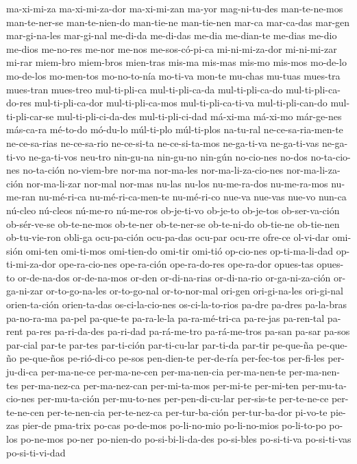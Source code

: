 {ma-xi-mi-za ma-xi-mi-za-dor ma-xi-mi-zan ma-yor mag-ni-tu-des man-te-ne-mos man-te-ner-se man-te-nien-do
man-tie-ne man-tie-nen mar-ca mar-ca-das mar-gen mar-gi-na-les mar-gi-nal me-di-da me-di-das me-dia
me-dian-te me-dias me-dio me-dios me-no-res me-nor me-nos me-sos-có-pi-ca mi-ni-mi-za-dor mi-ni-mi-zar
mi-rar miem-bro miem-bros mien-tras mis-ma mis-mas mis-mo mis-mos mo-de-lo mo-de-los mo-men-tos mo-no-to-nía
mo-ti-va mon-te mu-chas mu-tuas mues-tra mues-tran mues-treo mul-ti-pli-ca mul-ti-pli-ca-da mul-ti-pli-ca-do
mul-ti-pli-ca-do-res mul-ti-pli-ca-dor mul-ti-pli-ca-mos mul-ti-pli-ca-ti-va mul-ti-pli-can-do
mul-ti-pli-car-se mul-ti-pli-ci-da-des mul-ti-pli-ci-dad má-xi-ma má-xi-mo már-ge-nes más-ca-ra mé-to-do
mó-du-lo múl-ti-plo múl-ti-plos na-tu-ral ne-ce-sa-ria-men-te ne-ce-sa-rias ne-ce-sa-rio ne-ce-si-ta
ne-ce-si-ta-mos ne-ga-ti-va ne-ga-ti-vas ne-ga-ti-vo ne-ga-ti-vos neu-tro nin-gu-na nin-gu-no nin-gún
no-cio-nes no-dos no-ta-cio-nes no-ta-ción no-viem-bre nor-ma nor-ma-les nor-ma-li-za-cio-nes
nor-ma-li-za-ción nor-ma-li-zar nor-mal nor-mas nu-las nu-los nu-me-ra-dos nu-me-ra-mos nu-me-ran
nu-mé-ri-ca nu-mé-ri-ca-men-te nu-mé-ri-co nue-va nue-vas nue-vo nun-ca nú-cleo nú-cleos nú-me-ro nú-me-ros
ob-je-ti-vo ob-je-to ob-je-tos ob-ser-va-ción ob-sér-ve-se ob-te-ne-mos ob-te-ner ob-te-ner-se ob-te-ni-do
ob-tie-ne ob-tie-nen ob-tu-vie-ron obli-ga ocu-pa-ción ocu-pa-das ocu-par ocu-rre ofre-ce ol-vi-dar omi-sión
omi-ten omi-ti-mos omi-tien-do omi-tir omi-tió op-cio-nes op-ti-ma-li-dad op-ti-mi-za-dor ope-ra-cio-nes
ope-ra-ción ope-ra-do-res ope-ra-dor opues-tas opues-to or-de-na-dos or-de-na-mos or-den or-di-na-rias
or-di-na-rio or-ga-ni-za-ción or-ga-ni-zar or-to-go-na-les or-to-go-nal or-to-nor-mal ori-gen ori-gi-na-les
ori-gi-nal orien-ta-ción orien-ta-das os-ci-la-cio-nes os-ci-la-to-rios pa-dre pa-dres pa-la-bras
pa-no-ra-ma pa-pel pa-que-te pa-ra-le-la pa-ra-mé-tri-ca pa-re-jas pa-ren-tal pa-rent pa-res pa-ri-da-des
pa-ri-dad pa-rá-me-tro pa-rá-me-tros pa-san pa-sar pa-sos par-cial par-te par-tes par-ti-ción par-ti-cu-lar
par-ti-da par-tir pe-que-ña pe-que-ño pe-que-ños pe-rió-di-co pe-sos pen-dien-te per-de-ría per-fec-tos
per-fi-les per-ju-di-ca per-ma-ne-ce per-ma-ne-cen per-ma-nen-cia per-ma-nen-te per-ma-nen-tes per-ma-nez-ca
per-ma-nez-can per-mi-ta-mos per-mi-te per-mi-ten per-mu-ta-cio-nes per-mu-ta-ción per-mu-to-nes
per-pen-di-cu-lar per-sis-te per-te-ne-ce per-te-ne-cen per-te-nen-cia per-te-nez-ca per-tur-ba-ción
per-tur-ba-dor pi-vo-te pie-zas pier-de pma-trix po-cas po-de-mos po-li-no-mio po-li-no-mios po-li-to-po
po-los po-ne-mos po-ner po-nien-do po-si-bi-li-da-des po-si-bles po-si-ti-va po-si-ti-vas po-si-ti-vi-dad
}
